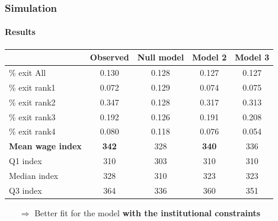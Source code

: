 \documentclass[xcolor=table,ignorenonframetext,12pt]{beamer}
\newenvironment{choixmarges}[2]{\begin{list}{}{%
\setlength{\topsep}{0pt}%
\setlength{\leftmargin}{0pt}%
\setlength{\rightmargin}{0pt}%
\setlength{\listparindent}{\parindent}%
\setlength{\itemindent}{\parindent}%
\setlength{\parsep}{0pt plus 1pt}%
\addtolength{\leftmargin}{#1}%
\addtolength{\rightmargin}{#2}%
}\item }{\end{list}}
\begin{document}
\begin{frame}
\frametitle{Simulation}
\framesubtitle{Results}
\begin{choixmarges}{-0.5cm}{-0.5cm}

\begin{table}[ht]
\centering
\begingroup\footnotesize
\begin{tabular}{lcccc}
\toprule
& Observed & Null model & Model 2 & Model 3 \\ 
\midrule
\% exit All & 0.130 & 0.128 & 0.127 & 0.127 \\ 
\% exit rank1 & 0.072 & 0.129 & 0.074 & 0.075 \\ 
\% exit rank2 & 0.347 & 0.128 & 0.317 & 0.313 \\ 
\% exit rank3 & 0.192 & 0.126 & 0.191 & 0.208 \\ 
\% exit rank4 & 0.080 & 0.118 & 0.076 & 0.054 \\ 
\midrule
\textbf{Mean wage index }& \textbf{342} & 328 & \textbf{340} & 336 \\ 
Q1 index & 310 & 303 & 310 & 310 \\ 
Median index & 328 & 310 & 323 & 323 \\ 
Q3 index & 364 & 336 & 360 & 351 \\ 
\bottomrule 
\end{tabular}
\endgroup
\end{table}

\vspace{0.2cm}
\begin{itemize}
\item[$\Rightarrow$] Better fit for the model \textbf{with the institutional constraints}

\end{itemize}


\end{choixmarges}

\end{frame}
\end{document}
